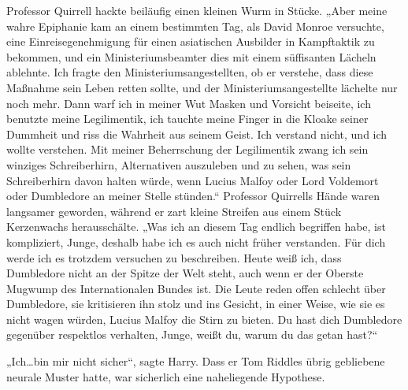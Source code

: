 Professor Quirrell hackte beiläufig einen kleinen Wurm in Stücke.
„Aber meine wahre Epiphanie kam an einem bestimmten Tag, als David Monroe versuchte, eine Einreisegenehmigung für einen asiatischen Ausbilder in Kampftaktik zu bekommen, und ein Ministeriumsbeamter dies mit einem süffisanten Lächeln ablehnte. Ich fragte den Ministeriumsangestellten, ob er verstehe, dass diese Maßnahme sein Leben retten sollte, und der Ministeriumsangestellte lächelte nur noch mehr. Dann warf ich in meiner Wut Masken und Vorsicht beiseite, ich benutzte meine Legilimentik, ich tauchte meine Finger in die Kloake seiner Dummheit und riss die Wahrheit aus seinem Geist. Ich verstand nicht, und ich wollte verstehen. Mit meiner Beherrschung der Legilimentik zwang ich sein winziges Schreiberhirn, Alternativen auszuleben und zu sehen, was sein Schreiberhirn davon halten würde, wenn Lucius Malfoy oder Lord Voldemort oder Dumbledore an meiner Stelle stünden.“
Professor Quirrells Hände waren langsamer geworden, während er zart kleine Streifen aus einem Stück Kerzenwachs herausschälte.
„Was ich an diesem Tag endlich begriffen habe, ist kompliziert, Junge, deshalb habe ich es auch nicht früher verstanden. Für dich werde ich es trotzdem versuchen zu beschreiben. Heute weiß ich, dass Dumbledore nicht an der Spitze der Welt steht, auch wenn er der Oberste Mugwump des Internationalen Bundes ist. Die Leute reden offen schlecht über Dumbledore, sie kritisieren ihn stolz und ins Gesicht, in einer Weise, wie sie es nicht wagen würden, Lucius Malfoy die Stirn zu bieten. Du hast dich Dumbledore gegenüber respektlos verhalten, Junge, weißt du, warum du das getan hast?“

„Ich…bin mir nicht sicher“, sagte Harry.
Dass er Tom Riddles übrig gebliebene neurale Muster hatte, war sicherlich eine naheliegende Hypothese.

